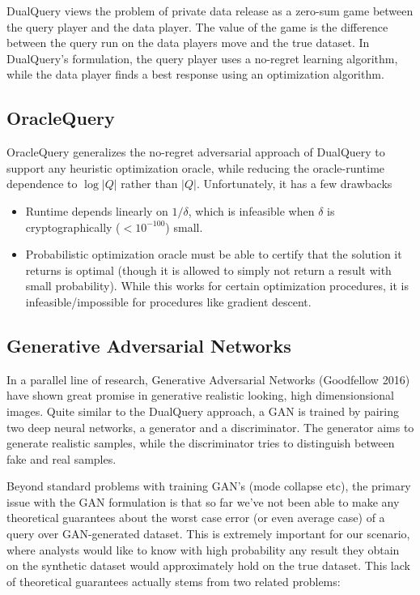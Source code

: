 \documentclass{article}
\begin{document}
DualQuery views the problem of private data release as a zero-sum game
between the query player and the data player. The value of the game is
the difference between the query run on the data players move and the
true dataset. In DualQuery's formulation, the query player uses a
no-regret learning algorithm, while the data player finds a best
response using an optimization algorithm.

\subsection{OracleQuery}

OracleQuery generalizes the no-regret adversarial approach of DualQuery
to support any heuristic optimization oracle, while reducing the
oracle-runtime dependence to \(\log |Q|\) rather than \(|Q|\).
Unfortunately, it has a few drawbacks

\begin{itemize}
\item Runtime depends linearly on \(1/\delta\), which is infeasible when
  \(\delta\) is cryptographically (\(<10^{-100}\)) small.
\item Probabilistic optimization oracle must be able to certify that the
  solution it returns is optimal (though it is allowed to simply not
  return a result with small probability). While this works for certain
  optimization procedures, it is infeasible/impossible for procedures
  like gradient descent. 
\end{itemize}

\hypertarget{header-n20}{%
\subsection{Generative Adversarial Networks}\label{header-n20}}

In a parallel line of research, Generative Adversarial Networks
(Goodfellow 2016) have shown great promise in generative realistic
looking, high dimensionsional images. Quite similar to the DualQuery
approach, a GAN is trained by pairing two deep neural networks, a
generator and a discriminator. The generator aims to generate realistic
samples, while the discriminator tries to distinguish between fake and
real samples.

Beyond standard problems with training GAN's (mode collapse etc), the
primary issue with the GAN formulation is that so far we've not been
able to make any theoretical guarantees about the worst case error (or
even average case) of a query over GAN-generated dataset. This is
extremely important for our scenario, where analysts would like to know
with high probability any result they obtain on the synthetic dataset
would approximately hold on the true dataset. This lack of theoretical
guarantees actually stems from two related problems:
\end{document}
